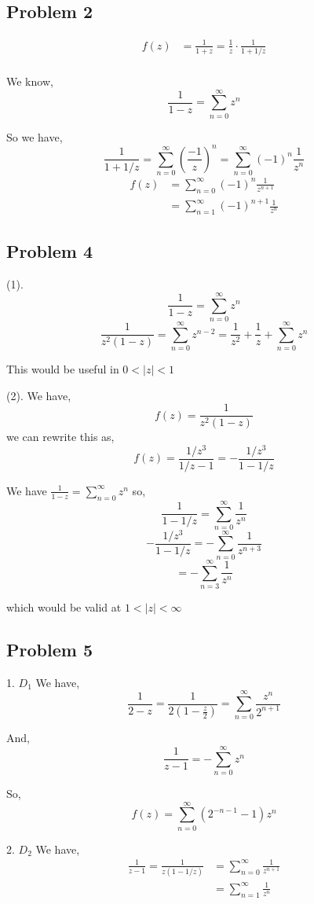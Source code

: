 \documentclass[a4paper]{report}
\begin{document}
\subsection*{Problem 2}
\begin{align*}
    f(z) &= \frac{1}{1 + z} = \frac{1}{z} \cdot \frac{1}{1 + 1 /z}\\
\end{align*}

We know, 
$$ \frac{1}{1 - z} =  \sum_{n=0}^{\infty} z^{n}$$ 

So we have, 
$$ \frac{1}{1+ 1 /z} = \sum_{n=0}^{\infty} (\frac{-1}{z})^{n}  =\sum_{n=0}^{\infty}  (-1)^{n} \frac{1}{z^{n}}$$ 
\begin{align*}
    f(z) &= \sum_{n=0}^{\infty} (-1)^{n} \frac{1}{z^{n+1}}\\
         &= \sum_{n=1}^{\infty} (-1)^{n+1} \frac{1}{z^{n}}
\end{align*}
\subsection*{Problem 4}

(1). 
$$ \frac{1}{1-z} = \sum_{n=0}^{\infty} z^{n} $$ 
$$  \frac{1}{z^2(1-z)} = \sum_{n=0}^{\infty} z^{n-2} = \frac{1}{z^2} + \frac{1}{z} + \sum_{n=0}^{\infty} z^{n}$$ 

This would be useful in $ 0 < |z| < 1$


(2). 
We have, 
$$ f(z) = \frac{1}{z^2(1- z)} $$  we can rewrite this as, 
$$ f(z) = \frac{1 / z^{3}}{1 / z - 1} = - \frac{1 / z^{3}}{1 - 1/z}  $$ 

We have $\frac{1}{1 - z} = \sum_{n=0}^{\infty} z^{n}$ so, 
$$ \frac{1}{1 - 1 /z} = \sum_{n=0}^{\infty} \frac{1}{z^{n}} $$ 
$$ -\frac{1 / z^{3}}{1 - 1 /z} = -\sum_{n=0}^{\infty} \frac{1}{z^{n + 3}} $$ 
$$ = - \sum_{n=3}^{\infty} \frac{1}{z^{n}} $$ 

which would be valid at $1 < |z| < \infty$
\subsection*{Problem 5}

1. $D_1$
We have, 
$$ \frac{1}{2 - z} = \frac{1}{2(1 - \frac{z}{2})} = \sum_{n=0}^{\infty} \frac{z^{n}}{2^{n + 1}} $$ 

And, 
$$ \frac{1}{z - 1} = - \sum_{n=0}^{\infty} z^{n} $$ 

So, 
$$ f(z) = \sum_{n=0}^{\infty} (2^{-n-1} - 1) z^{n}$$ 

2. $D_2$ 
We have, 
\begin{align*}
    \frac{1}{z-1} = \frac{1}{z(1 - 1 /z)} &= \sum_{n=0}^{\infty} \frac{1}{z^{n+1}}\\
                                          &= \sum_{n=1}^{\infty} \frac{1}{z^{n}}\\
\end{align*}
\end{document}
